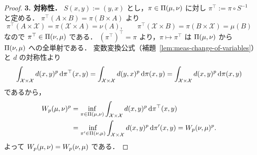 \begin{proof}
  \textbf{3. 対称性．}
  $S(x,y):=(y,x)$ とし，$\pi\in\Pi(\mu,\nu)$ に対し
  $\pi^\top:=\pi\circ S^{-1}$ と定める．
  $\pi^\top(A\times B)=\pi(B\times A)$ より
  \[
    \pi^\top(A\times\mathcal{X})=\pi(\mathcal{X}\times A)=\nu(A),\qquad
    \pi^\top(\mathcal{X}\times B)=\pi(B\times\mathcal{X})=\mu(B)
  \]
  なので $\pi^\top\in\Pi(\nu,\mu)$ である．
  $(\pi^\top)^\top=\pi$ より，$\pi\mapsto\pi^\top$ は
  $\Pi(\mu,\nu)$ から $\Pi(\nu,\mu)$ への全単射である．
  変数変換公式（補題~\ref{lem:meas-change-of-variables}）と $d$ の対称性より
  \[
    \int_{\mathcal{X}\times\mathcal{X}}d(x,y)^p\,\mathrm{d}\pi^\top(x,y)
    =\int_{\mathcal{X}\times\mathcal{X}}d(y,x)^p\,\mathrm{d}\pi(x,y)
    =\int_{\mathcal{X}\times\mathcal{X}}d(x,y)^p\,\mathrm{d}\pi(x,y)
  \]
  であるから，
  \[
    \begin{aligned}
      W_p(\mu,\nu)^p
      &=\inf_{\pi\in\Pi(\mu,\nu)}
        \int_{\mathcal{X}\times\mathcal{X}}d(x,y)^p\,\mathrm{d}\pi^\top(x,y)\\
      &=\inf_{\pi'\in\Pi(\nu,\mu)}
        \int_{\mathcal{X}\times\mathcal{X}}d(x,y)^p\,\mathrm{d}\pi'(x,y)
      =W_p(\nu,\mu)^p.
    \end{aligned}
  \]
  よって $W_p(\mu,\nu)=W_p(\nu,\mu)$ である．


\end{proof}
